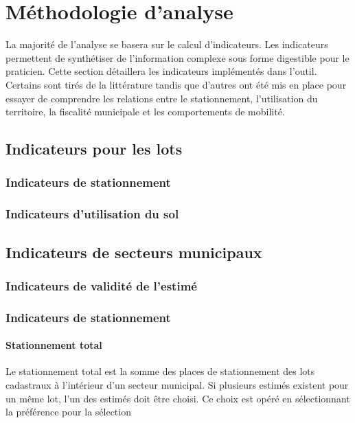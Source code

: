 \section{Méthodologie d'analyse} \label{sec:meth_analyse}
    La majorité de l'analyse se basera sur le calcul d'indicateurs. Les indicateurs permettent de synthétiser de l'information complexe sous forme digestible pour le praticien. Cette section détaillera les indicateurs implémentés dans l'outil. Certains sont tirés de la littérature tandis que d'autres ont été mis en place pour essayer de comprendre les relations entre le stationnement, l'utilisation du territoire, la fiscalité municipale et les comportements de mobilité.

    \subsection{Indicateurs pour les lots}
    \subsubsection{Indicateurs de stationnement}
    \subsubsection{Indicateurs d'utilisation du sol}

    \subsection{Indicateurs de secteurs municipaux}
    \subsubsection{Indicateurs de validité de l'estimé}
    
    \subsubsection{Indicateurs de stationnement}
    \paragraph{Stationnement total}
    Le stationnement total est la somme des places de stationnement des lots cadastraux à l'intérieur d'un secteur municipal. Si plusieurs estimés existent pour un même lot, l'un des estimés doit être choisi. Ce choix est opéré en sélectionnant la préférence pour la sélection  

